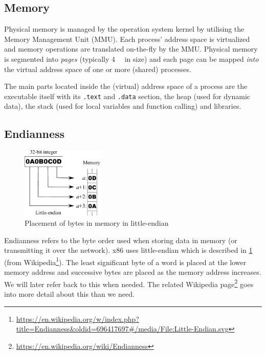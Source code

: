 \documentclass[article]{uibk}
\begin{document}
\subsection{Memory}

Physical memory is managed by the operation system kernel by utilising the
Memory Management Unit (MMU). Each process' address space is virtualized and
memory operations are translated on-the-fly by the MMU. Physical memory is
segmented into \textit{pages} (typically \SI{4}{\kibi\byte} in size) and each
page can be mapped \emph{into} the virtual address space of one or more
(shared) processes.~\cite[pp.~400]{unix_interals}

The main parts located inside the (virtual) address space of a process are the
executable itself with its \texttt{.text} and \texttt{.data} section, the heap
(used for dynamic data), the stack (used for local variables and function
calling) and libraries.

\subsection{Endianness}
\label{sub:endianness}

\begin{figure}[H]
    \centering
    \includegraphics[width=0.35\textwidth]{gfx/little_endian.pdf}
    \caption{Placement of bytes in memory in little-endian}
    \label{fig:little_endian}
\end{figure}

Endianness refers to the byte order used when storing data in memory (or
transmitting it over the network). x86 uses little-endian which is described in
\cref{fig:little_endian} (from
Wikipedia\footnote{\url{https://en.wikipedia.org/w/index.php?title=Endianness&oldid=696417697\#/media/File:Little-Endian.svg}}).
The least significant byte of a word is placed at the lower memory address and
successive bytes are placed as the memory address increases. We will later
refer back to this when needed. The related Wikipedia
page\footnote{\url{https://en.wikipedia.org/wiki/Endianness}} goes into more
detail about this than we need.
\end{document}
